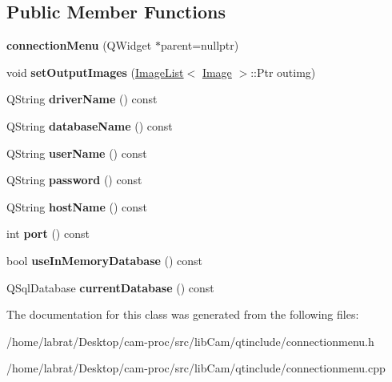 \subsection*{Public Member Functions}
\begin{DoxyCompactItemize}
\item 
{\bfseries connection\+Menu} (Q\+Widget $\ast$parent=nullptr)\hypertarget{classconnectionMenu_aa87f3d2c274a8d29ed3c6dd553add391}{}\label{classconnectionMenu_aa87f3d2c274a8d29ed3c6dd553add391}

\item 
void {\bfseries set\+Output\+Images} (\hyperlink{classImageList}{Image\+List}$<$ \hyperlink{classImage}{Image} $>$\+::Ptr outimg)\hypertarget{classconnectionMenu_a6f950d2d62ea36a66b3a776b130635ab}{}\label{classconnectionMenu_a6f950d2d62ea36a66b3a776b130635ab}

\item 
Q\+String {\bfseries driver\+Name} () const \hypertarget{classconnectionMenu_aef48e171811f69a2bd079e8cd9db4ea2}{}\label{classconnectionMenu_aef48e171811f69a2bd079e8cd9db4ea2}

\item 
Q\+String {\bfseries database\+Name} () const \hypertarget{classconnectionMenu_a0f1d61138b91d54483d051151cf5b5f3}{}\label{classconnectionMenu_a0f1d61138b91d54483d051151cf5b5f3}

\item 
Q\+String {\bfseries user\+Name} () const \hypertarget{classconnectionMenu_ab9e9165781c77b19ba1a05a5a62c5b9c}{}\label{classconnectionMenu_ab9e9165781c77b19ba1a05a5a62c5b9c}

\item 
Q\+String {\bfseries password} () const \hypertarget{classconnectionMenu_afb7cbc2f5029567824451afcb5ba0206}{}\label{classconnectionMenu_afb7cbc2f5029567824451afcb5ba0206}

\item 
Q\+String {\bfseries host\+Name} () const \hypertarget{classconnectionMenu_a79d183c4750d3a2d4c1b3316b05ab1da}{}\label{classconnectionMenu_a79d183c4750d3a2d4c1b3316b05ab1da}

\item 
int {\bfseries port} () const \hypertarget{classconnectionMenu_a8f6a9bb6f4d515b068d2aacebd772c9f}{}\label{classconnectionMenu_a8f6a9bb6f4d515b068d2aacebd772c9f}

\item 
bool {\bfseries use\+In\+Memory\+Database} () const \hypertarget{classconnectionMenu_a38652ab512e0df213b9b13e1b21c2a2c}{}\label{classconnectionMenu_a38652ab512e0df213b9b13e1b21c2a2c}

\item 
Q\+Sql\+Database {\bfseries current\+Database} () const \hypertarget{classconnectionMenu_aaa8aaf26ba2626c8a3cc395e42bcd68c}{}\label{classconnectionMenu_aaa8aaf26ba2626c8a3cc395e42bcd68c}

\end{DoxyCompactItemize}


The documentation for this class was generated from the following files\+:\begin{DoxyCompactItemize}
\item 
/home/labrat/\+Desktop/cam-\/proc/src/lib\+Cam/qtinclude/connectionmenu.\+h\item 
/home/labrat/\+Desktop/cam-\/proc/src/lib\+Cam/qtinclude/connectionmenu.\+cpp\end{DoxyCompactItemize}
